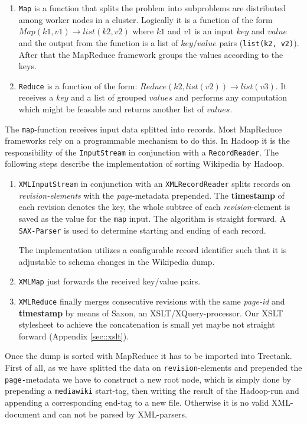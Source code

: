 \begin{enumerate}
\item \texttt{Map} is a function that splits the problem into subproblems are distributed among worker nodes in a cluster. Logically it is a function of the form \texttt{$Map(k1,v1) \rightarrow list(k2,v2)$} where $k1$ and $v1$ is an input $key$ and $value$ and the output from the function is a list of $key/value$ pairs (\texttt{list(k2, v2)}). After that the MapReduce framework groups the values according to the keys.
\item \texttt{Reduce} is a function of the form: \texttt{$Reduce(k2, list (v2)) \rightarrow list(v3)$}. It receives a $key$ and a list of grouped $values$ and performs any computation which might be feasable and returns another list of $values$.
\end{enumerate}

The \texttt{map}-function receives input data splitted into records. Most MapReduce frameworks rely on a programmable mechanism to do this. In Hadoop it is the responsibility of the \texttt{InputStream} in conjunction with a \texttt{RecordReader}. The following steps describe the implementation of sorting Wikipedia by Hadoop.

\begin{enumerate}
\item \texttt{XMLInputStream} in conjunction with an \texttt{XMLRecordReader} splits records on \emph{revision-elements} with the \emph{page}-metadata prepended. The \textbf{timestamp} of each revision denotes the key, the whole subtree of each \emph{revision}-element is saved as the value for the \texttt{map} input. The algorithm is straight forward. A \texttt{SAX-Parser} is used to determine starting and ending of each record.

The implementation utilizes a configurable record identifier such that it is adjustable to schema changes in the Wikipedia dump. 

\item \texttt{XMLMap} just forwards the received key/value pairs.
\item \texttt{XMLReduce} finally merges consecutive revisions with the same \emph{page-id} and \textbf{timestamp} by means of Saxon, an XSLT/XQuery-processor. Our XSLT stylesheet to achieve the concatenation is small yet maybe not straight forward (Appendix \ref{sec::xslt}).
\end{enumerate}

Once the dump is sorted with MapReduce it has to be imported into Treetank. First of all, as we have splitted the data on \texttt{revision}-elements and pre\-pen\-ded the \texttt{page-}metadata we have to construct a new root node, which is simply done by prepending a \texttt{mediawiki} start-tag, then writing the result of the Hadoop-run and appending a corresponding end-tag to a new file. Otherwise it is no valid XML-document and can not be parsed by XML-parsers.

